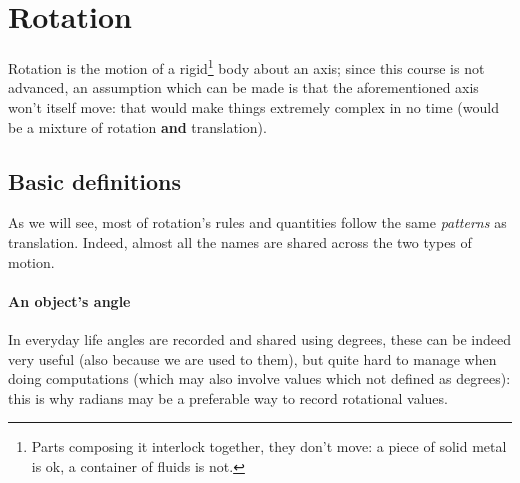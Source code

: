 \documentclass{scrartcl}
\begin{document}
    \section{Rotation}
	Rotation is the motion of a rigid\footnote{Parts composing it interlock together, they don't move: a piece of solid metal is ok, a container of fluids is not.} body about an axis; since this course is not advanced, an assumption which can be made is that the aforementioned axis won't itself move: that would make things extremely complex in no time (would be a mixture of rotation \textbf{and} translation).
    \subsection{Basic definitions} As we will see, most of rotation's rules and quantities follow the same \emph{patterns} as translation. Indeed, almost all the names are shared across the two types of motion.
    \paragraph{An object's angle} In everyday life angles are recorded and shared using degrees, these can be indeed very useful (also because we are used to them), but quite hard to manage when doing computations (which may also involve values which not defined as degrees): this is why radians may be a preferable way to record rotational values.
\end{document}
